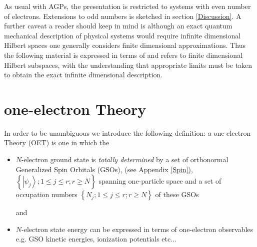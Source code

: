 \documentclass[aps,preprint]{revtex4}%
\begin{document}
As usual with AGPs, the presentation is restricted to systems with even number
of electrons. Extensions to odd numbers is sketched in section
\ref{Discussion}. A further caveat a reader should keep in mind is although an
exact quantum mechanical description of physical systems would require
infinite dimensional Hilbert spaces one generally considers finite dimensional
approximations. Thus the following material is expressed in terms of and
refers to finite dimensional Hilbert subspaces, with the understanding that
appropriate limits must be taken to obtain the exact infinite dimensional description.

\section{one-electron Theory\label{OET}}

In order to be unambiguous we introduce the following definition: a
one-electron Theory (OET) is one in which the

\begin{itemize}
\item $N$-electron ground state is \emph{totally determined} by a set of
orthonormal Generalized Spin Orbitals (GSOs), (see Appendix \ref{Spin}),
$\left\{  \left\vert \psi_{j}\right\rangle ;1\leq j\leq r;r\geq N\right\}  $
spanning one-particle space and a set of occupation numbers $\left\{
N_{j};1\leq j\leq r;r\geq N\right\}  $ of these GSOs

and

\item $N$-electron state energy can be expressed in terms of one-electron
observables e.g. GSO kinetic energies, ionization potentials etc...
\end{itemize}
\end{document}

